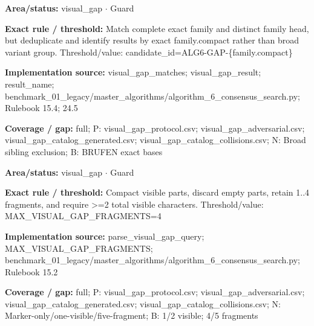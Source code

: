 \begin{tcolorbox}[enhanced,breakable,colback=white,colframe=Muted!45,boxrule=0.45pt,arc=1.5pt,left=6pt,right=6pt,top=5pt,bottom=5pt,title={\texttt{VG-EXACT-FAMILY-06}},title after break={\texttt{VG-EXACT-FAMILY-06}\ (continued)},fonttitle=\headingfont\bfseries\color{Navy},coltitle=Navy]
\textbf{Area/status:} visual\_\allowbreak{}gap $\boldsymbol{\cdot}$ Guard\par
\smallskip
\textbf{Exact rule / threshold:} Match complete exact family and distinct family head, but deduplicate and identify results by exact family.compact rather than broad variant group. Threshold/\allowbreak{}value: candidate\_\allowbreak{}id=ALG6-GAP-\{family.compact\}\par
\smallskip
\textbf{Implementation source:} visual\_\allowbreak{}gap\_\allowbreak{}matches; visual\_\allowbreak{}gap\_\allowbreak{}result; result\_\allowbreak{}name; benchmark\_\allowbreak{}01\_\allowbreak{}legacy/\allowbreak{}master\_\allowbreak{}algorithms/\allowbreak{}algorithm\_\allowbreak{}6\_\allowbreak{}consensus\_\allowbreak{}search.py; Rulebook 15.4; 24.5\par
\smallskip
\textbf{Coverage / gap:} full; P: visual\_\allowbreak{}gap\_\allowbreak{}protocol.csv; visual\_\allowbreak{}gap\_\allowbreak{}adversarial.csv; visual\_\allowbreak{}gap\_\allowbreak{}catalog\_\allowbreak{}generated.csv; visual\_\allowbreak{}gap\_\allowbreak{}catalog\_\allowbreak{}collisions.csv; N: Broad sibling exclusion; B: BRUFEN exact bases
\end{tcolorbox}
\begin{tcolorbox}[enhanced,breakable,colback=white,colframe=Muted!45,boxrule=0.45pt,arc=1.5pt,left=6pt,right=6pt,top=5pt,bottom=5pt,title={\texttt{VG-EXPLICIT-PARSER-02}},title after break={\texttt{VG-EXPLICIT-PARSER-02}\ (continued)},fonttitle=\headingfont\bfseries\color{Navy},coltitle=Navy]
\textbf{Area/status:} visual\_\allowbreak{}gap $\boldsymbol{\cdot}$ Guard\par
\smallskip
\textbf{Exact rule / threshold:} Compact visible parts, discard empty parts, retain 1..4 fragments, and require >=2 total visible characters. Threshold/\allowbreak{}value: MAX\_\allowbreak{}VISUAL\_\allowbreak{}GAP\_\allowbreak{}FRAGMENTS=4\par
\smallskip
\textbf{Implementation source:} parse\_\allowbreak{}visual\_\allowbreak{}gap\_\allowbreak{}query; MAX\_\allowbreak{}VISUAL\_\allowbreak{}GAP\_\allowbreak{}FRAGMENTS; benchmark\_\allowbreak{}01\_\allowbreak{}legacy/\allowbreak{}master\_\allowbreak{}algorithms/\allowbreak{}algorithm\_\allowbreak{}6\_\allowbreak{}consensus\_\allowbreak{}search.py; Rulebook 15.2\par
\smallskip
\textbf{Coverage / gap:} full; P: visual\_\allowbreak{}gap\_\allowbreak{}protocol.csv; visual\_\allowbreak{}gap\_\allowbreak{}adversarial.csv; visual\_\allowbreak{}gap\_\allowbreak{}catalog\_\allowbreak{}generated.csv; visual\_\allowbreak{}gap\_\allowbreak{}catalog\_\allowbreak{}collisions.csv; N: Marker-only/\allowbreak{}one-visible/\allowbreak{}five-fragment; B: 1/\allowbreak{}2 visible; 4/\allowbreak{}5 fragments
\end{tcolorbox}
